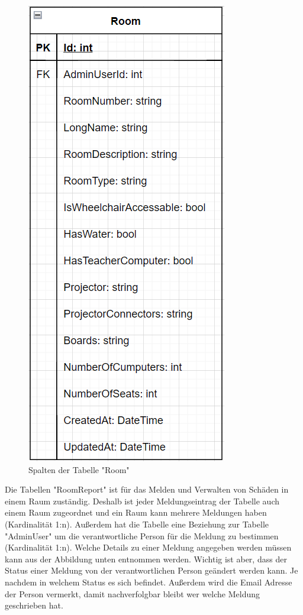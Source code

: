 \begin{figure}[H]
    \centering
    \includegraphics{media/MariaDB/Room.png}
    \caption{Spalten der Tabelle "Room"}
\end{figure}


Die Tabellen "RoomReport" ist für das Melden und Verwalten von Schäden in einem Raum zuständig. Deshalb ist jeder Meldungseintrag der Tabelle auch einem Raum zugeordnet und ein Raum kann mehrere Meldungen haben (Kardinalität 1:n). Außerdem hat die Tabelle eine Beziehung zur Tabelle "AdminUser" um die verantwortliche Person für die Meldung zu bestimmen (Kardinalität 1:n). Welche Details zu einer Meldung angegeben werden müssen kann aus der Abbildung unten entnommen werden. Wichtig ist aber, dass der Status einer Meldung von der verantwortlichen Person geändert werden kann. Je nachdem in welchem Status es sich befindet. Außerdem wird die Email Adresse der Person vermerkt, damit nachverfolgbar bleibt wer welche Meldung geschrieben hat.

